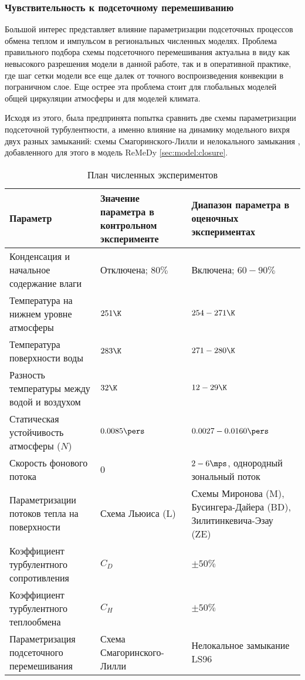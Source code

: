 \subsubsection{Чувствительность к подсеточному перемешиванию}
Большой интерес представляет влияние параметризации подсеточных процессов обмена теплом и импульсом в региональных численных моделях. Проблема правильного подбора схемы подсеточного перемешивания актуальна в виду как невысокого разрешения модели в данной работе, так и в оперативной практике, где шаг сетки модели все еще далек от точного воспроизведения конвекции в пограничном слое. Еще острее эта проблема стоит для глобальных моделей общей циркуляции атмосферы и для моделей климата. 

Исходя из этого, была предпринята попытка сравнить две схемы параметризации подсеточной турбулентности, а именно влияние на динамику модельного вихря двух разных замыканий: схемы Смагоринского-Лилли и нелокального замыкания \citep{LupkesSchluenzen1996,NohEtAl2003}, добавленного для этого в модель ReMeDy \ref{sec:model:closure}.

\begin{table}
\centering
\caption{План численных экспериментов}
\label{tab:expplan}
\small
\begin{tabu} to \textwidth {X[l]X[l]X[l]}
\toprule
Параметр & Значение параметра в контрольном эксперименте & Диапазон параметра в оценочных экспериментах \\
\midrule
Конденсация и начальное содержание влаги & Отключена; $80\%$ & Включена; $60-90\%$ \\
Температура на нижнем уровне атмосферы & $251\K$ & $254-271\K$ \\
Температура поверхности воды & $283\K$ & $271-280\K$ \\
Разность температуры между водой и воздухом & $32\K$ & $12-29\K$ \\
Статическая устойчивость атмосферы ($N$) & $0.0085\pers$ & $0.0027-0.0160\pers$ \\
Скорость фонового потока & 0 & $2-6\mps$, однородный зональный поток \\
Параметризации потоков тепла на поверхности & Схема Льюиса (L) & Схемы Миронова (M), Бусингера-Дайера (BD), Зилитинкевича-Эзау (ZE) \\
Коэффициент турбулентного сопротивления & $C_D$ & $\pm 50\%$ \\
Коэффициент турбулентного теплообмена & $C_H$ & $\pm 50\%$ \\
Параметризация подсеточного перемешивания	& Схема Смагоринского-Лилли & Нелокальное замыкание LS96 \\
\bottomrule
\end{tabu}
\end{table}

